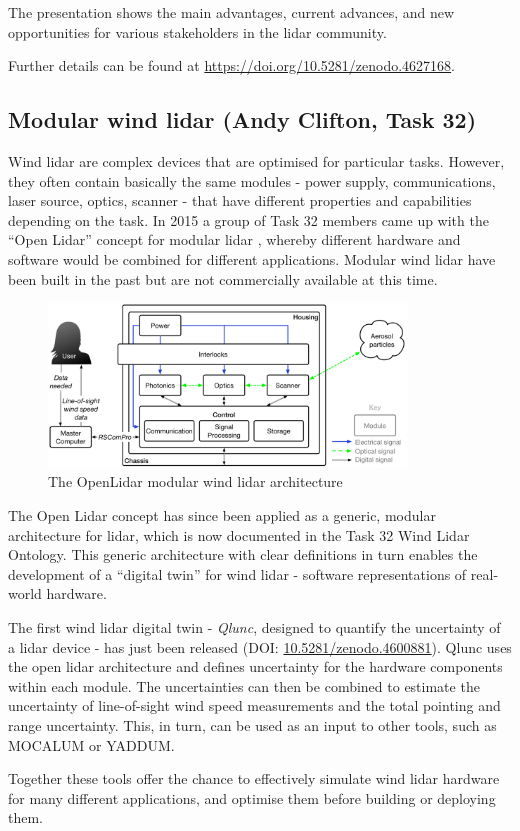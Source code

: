 The presentation shows the main advantages, current advances, and new opportunities for various stakeholders in the lidar community. 

Further details can be found at \href{https://doi.org/10.5281/zenodo.4627168}{https://doi.org/10.5281/zenodo.4627168}. 

\subsection{Modular wind lidar (Andy Clifton, Task 32)}
Wind lidar are complex devices that are optimised for particular tasks. However, they often contain basically the same modules - power supply, communications, laser source, optics, scanner - that have different properties and capabilities depending on the task. In 2015 a group of Task 32 members came up with the “Open Lidar” concept for modular lidar \citep[Figure \ref{fig:modular_lidar} and ][]{clifton_2019_openlidar}, whereby different hardware and software would be combined for different applications. Modular wind lidar have been built in the past but are not commercially available at this time.

\begin{figure}[!hbt]
    \centering
    \includegraphics[width=0.85\textwidth]{figures/OpenLidarModules.png}
    \caption{The OpenLidar modular wind lidar architecture \cite{clifton_2019_openlidar}}
    \label{fig:modular_lidar}
\end{figure}

The Open Lidar concept has since been applied as a generic, modular architecture for lidar, which is now documented in the Task 32 Wind Lidar Ontology. This generic architecture with clear definitions in turn enables the development of a “digital twin” for wind lidar - software representations of real-world hardware.

The first wind lidar digital twin - \emph{Qlunc}, designed to quantify the uncertainty of a lidar device - has just been released (DOI: \href{https://doi.org/10.5281/zenodo.4600881}{10.5281/zenodo.4600881}). Qlunc uses the open lidar architecture and defines uncertainty for the hardware components within each module. The uncertainties can then be combined to estimate the uncertainty of line-of-sight wind speed measurements and the total pointing and range uncertainty. This, in turn, can be used as an input to other tools, such as MOCALUM or YADDUM.

Together these tools offer the chance to effectively simulate wind lidar hardware for many different applications, and optimise them before building or deploying them.
